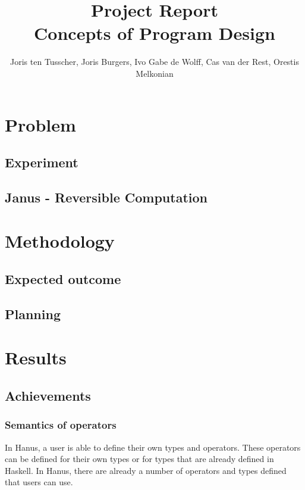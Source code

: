 \documentclass[12pt,a4paper]{article}
\title{\textbf{Project Report \\ \small{Concepts of Program Design}}}
\author{\small{Joris ten Tusscher, Joris Burgers, Ivo Gabe de Wolff, Cas van der Rest, Orestis Melkonian}}
\date{}
\begin{document}
\maketitle

\section{Problem}
    \subsection{Experiment}
    \subsection{Janus - Reversible Computation}
\section{Methodology}
	\subsection{Expected outcome}
	\subsection{Planning}
\section{Results}
	\subsection{Achievements}
	
	
	
	\subsubsection{Semantics of operators}	
	In Hanus, a user is able to define their own types and operators. These operators can be defined for their own types or for types that are already defined in Haskell. In Hanus, there are already a number of operators and types defined that users can use. 
\end{document}
